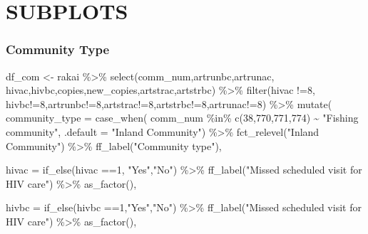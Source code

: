 \documentclass[
  letterpaper,
  DIV=11,
  numbers=noendperiod]{scrartcl}
\newenvironment{Shaded}{\begin{snugshade}}{\end{snugshade}}
\newcommand{\AttributeTok}[1]{\textcolor[rgb]{0.40,0.45,0.13}{#1}}
\newcommand{\DecValTok}[1]{\textcolor[rgb]{0.68,0.00,0.00}{#1}}
\newcommand{\FunctionTok}[1]{\textcolor[rgb]{0.28,0.35,0.67}{#1}}
\newcommand{\NormalTok}[1]{\textcolor[rgb]{0.00,0.23,0.31}{#1}}
\newcommand{\OtherTok}[1]{\textcolor[rgb]{0.00,0.23,0.31}{#1}}
\newcommand{\SpecialCharTok}[1]{\textcolor[rgb]{0.37,0.37,0.37}{#1}}
\newcommand{\StringTok}[1]{\textcolor[rgb]{0.13,0.47,0.30}{#1}}
\begin{document}
\section{SUBPLOTS}\label{subplots}

\subsubsection{Community Type}\label{community-type}

\begin{Shaded}
\begin{Highlighting}[]
\NormalTok{df\_com }\OtherTok{\textless{}{-}}\NormalTok{  rakai }\SpecialCharTok{\%\textgreater{}\%} 
  \FunctionTok{select}\NormalTok{(comm\_num,artrunbc,artrunac,}
\NormalTok{         hivac,hivbc,copies,new\_copies,artstrac,artstrbc) }\SpecialCharTok{\%\textgreater{}\%} 
  \FunctionTok{filter}\NormalTok{(hivac }\SpecialCharTok{!=}\DecValTok{8}\NormalTok{, hivbc}\SpecialCharTok{!=}\DecValTok{8}\NormalTok{,artrunbc}\SpecialCharTok{!=}\DecValTok{8}\NormalTok{,artstrac}\SpecialCharTok{!=}\DecValTok{8}\NormalTok{,artstrbc}\SpecialCharTok{!=}\DecValTok{8}\NormalTok{,artrunac}\SpecialCharTok{!=}\DecValTok{8}\NormalTok{) }\SpecialCharTok{\%\textgreater{}\%} 
  \FunctionTok{mutate}\NormalTok{(}
    \AttributeTok{community\_type =} \FunctionTok{case\_when}\NormalTok{(}
\NormalTok{      comm\_num }\SpecialCharTok{\%in\%} \FunctionTok{c}\NormalTok{(}\DecValTok{38}\NormalTok{,}\DecValTok{770}\NormalTok{,}\DecValTok{771}\NormalTok{,}\DecValTok{774}\NormalTok{) }\SpecialCharTok{\textasciitilde{}} \StringTok{"Fishing community"}\NormalTok{,}
      \AttributeTok{.default =} \StringTok{"Inland Community"}\NormalTok{) }\SpecialCharTok{\%\textgreater{}\%} 
      \FunctionTok{fct\_relevel}\NormalTok{(}\StringTok{"Inland Community"}\NormalTok{) }\SpecialCharTok{\%\textgreater{}\%} 
      \FunctionTok{ff\_label}\NormalTok{(}\StringTok{"Community type"}\NormalTok{),}

    \AttributeTok{hivac =} \FunctionTok{if\_else}\NormalTok{(hivac }\SpecialCharTok{==}\DecValTok{1}\NormalTok{, }\StringTok{"Yes"}\NormalTok{,}\StringTok{"No"}\NormalTok{) }\SpecialCharTok{\%\textgreater{}\%} 
    \FunctionTok{ff\_label}\NormalTok{(}\StringTok{"Missed scheduled visit for HIV care"}\NormalTok{) }\SpecialCharTok{\%\textgreater{}\%} 
      \FunctionTok{as\_factor}\NormalTok{(),}
   
     \AttributeTok{hivbc =} \FunctionTok{if\_else}\NormalTok{(hivbc }\SpecialCharTok{==}\DecValTok{1}\NormalTok{,}\StringTok{"Yes"}\NormalTok{,}\StringTok{"No"}\NormalTok{) }\SpecialCharTok{\%\textgreater{}\%} 
    \FunctionTok{ff\_label}\NormalTok{(}\StringTok{"Missed scheduled visit for HIV care"}\NormalTok{) }\SpecialCharTok{\%\textgreater{}\%} 
    \FunctionTok{as\_factor}\NormalTok{(),}
 

\end{Highlighting}
\end{Shaded}
\end{document}
